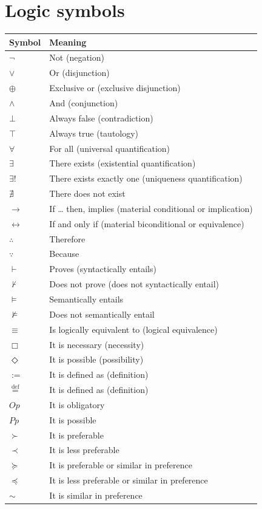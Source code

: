 \documentclass[11pt]{article}
\newcommand{\defequal}{\stackrel{\scriptscriptstyle\mathrm{def}}{=}}
\begin{document}
\section{Logic symbols}
\label{sec:org2a0aa89}
\begin{center}
\begin{tabular}{l|l}
Symbol & Meaning\\
\hline
\(\neg\) & Not (negation)\\
\(\vee\) & Or (disjunction)\\
\(\oplus\) & Exclusive or (exclusive disjunction)\\
\(\wedge\) & And (conjunction)\\
\(\bot\) & Always false (contradiction)\\
\(\top\) & Always true (tautology)\\
\(\forall\) & For all (universal quantification)\\
\(\exists\) & There exists (existential quantification)\\
\(\exists !\) & There exists exactly one (uniqueness quantification)\\
\(\nexists\) & There does not exist\\
\(\rightarrow\) & If \ldots{} then, implies (material conditional or implication)\\
\(\leftrightarrow\) & If and only if (material biconditional or equivalence)\\
\(\therefore\) & Therefore\\
\(\because\) & Because\\
\(\vdash\) & Proves (syntactically entails)\\
\(\nvdash\) & Does not prove (does not syntactically entail)\\
\(\vDash\) & Semantically entails\\
\(\nvDash\) & Does not semantically entail\\
\(\equiv\) & Is logically equivalent to (logical equivalence)\\
\(\Box\) & It is necessary (necessity)\\
\(\Diamond\) & It is possible (possibility)\\
\(:=\) & It is defined as (definition)\\
\(\defequal\) & It is defined as (definition)\\
\(Op\) & It is obligatory\\
\(Pp\) & It is possible\\
\(\succ\) & It is preferable\\
\(\prec\) & It is less preferable\\
\(\succeq\) & It is preferable or similar in preference\\
\(\preceq\) & It is less preferable or similar in preference\\
\(\sim\) & It is similar in preference\\
\end{tabular}
\end{center}
\end{document}
